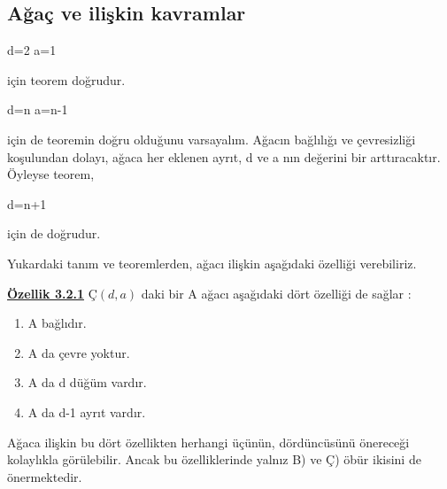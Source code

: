 \documentclass[11pt]{amsbook}
\begin{document}
\subsection{Ağaç ve ilişkin kavramlar}


\qquad d=2 \qquad a=1 \par
için teorem doğrudur. \par
\qquad d=n \qquad a=n-1 \par
için de teoremin doğru olduğunu varsayalım. Ağacın bağlılığı ve çevresizliği koşulundan dolayı, ağaca her eklenen ayrıt, d ve a nın değerini bir arttıracaktır. Öyleyse teorem, \par
\qquad d=n+1 \par
için de doğrudur.\par
Yukardaki tanım ve teoremlerden, ağacı ilişkin aşağıdaki özelliği verebiliriz. \par
\textbf{\underline{Özellik 3.2.1}} $Ç(d,a)$ daki bir A ağacı aşağıdaki dört özelliği de sağlar :

\begin{enumerate}[label=\Alph*)]
\item A bağlıdır.
\item A da çevre yoktur.
\item A da d düğüm vardır.
\item A da d-1 ayrıt vardır.
\end{enumerate}

Ağaca ilişkin bu dört özellikten herhangi üçünün, dördüncüsünü önereceği kolaylıkla görülebilir. Ancak bu özelliklerinde yalnız B) ve Ç) öbür ikisini de önermektedir.
\end{document}
